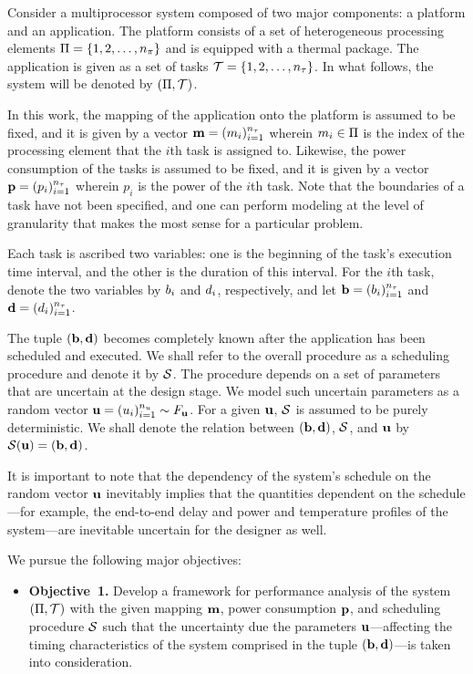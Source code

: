 Consider a multiprocessor system composed of two major components: a platform
and an application. The platform consists of a set of heterogeneous processing
elements $\Pi = \{ 1, 2, \dots, {n_\pi} \}$ and is equipped with a thermal
package. The application is given as a set of tasks $\mathcal{T} = \{ 1, 2, \dots,
{n_\tau} \}$. In what follows, the system will be denoted by $(\Pi, \mathcal{T})$.

In this work, the mapping of the application onto the platform is assumed to be
fixed, and it is given by a vector $\mathbf{m} = (m_i)_{i = 1}^{{n_\tau}}$ wherein $m_i
\in \Pi$ is the index of the processing element that the $i$th task is
assigned to. Likewise, the power consumption of the tasks is assumed to be
fixed, and it is given by a vector $\mathbf{p} = (p_i)_{i = 1}^{{n_\tau}}$ wherein $p_i$
is the power of the $i$th task. Note that the boundaries of a task have not been
specified, and one can perform modeling at the level of granularity that makes
the most sense for a particular problem.

Each task is ascribed two variables: one is the beginning of the task's
execution time interval, and the other is the duration of this interval. For the
$i$th task, denote the two variables by $b_i$ and $d_i$, respectively, and let
$\mathbf{b} = (b_i)_{i=1}^{{n_\tau}}$ and $\mathbf{d} = (d_i)_{i=1}^{{n_\tau}}$.

The tuple $(\mathbf{b}, \mathbf{d})$ becomes completely known after the application has been
scheduled and executed. We shall refer to the overall procedure as a scheduling
procedure and denote it by $\mathcal{S}$. The procedure depends on a set of
parameters that are uncertain at the design stage. We model such uncertain
parameters as a random vector $\mathbf{u} = (u_i)_{i = 1}^{n_u} \sim F_{\mathbf{u}}$.
For a given $\mathbf{u}$, $\mathcal{S}$ is assumed to be purely deterministic. We shall
denote the relation between $(\mathbf{b}, \mathbf{d})$, $\mathcal{S}$, and $\mathbf{u}$ by
$\mathcal{S}(\mathbf{u}) = (\mathbf{b}, \mathbf{d})$.

It is important to note that the dependency of the system's schedule on the
random vector $\mathbf{u}$ inevitably implies that the quantities dependent on the
schedule---for example, the end-to-end delay and power and temperature profiles
of the system---are inevitable uncertain for the designer as well.

We pursue the following major objectives:
\begin{itemize}

\item {\bfseries Objective~1.} Develop a framework for performance analysis of
  the system $(\Pi, \mathcal{T})$ with the given mapping $\mathbf{m}$, power
  consumption $\mathbf{p}$, and scheduling procedure $\mathcal{S}$ such that the
  uncertainty due the parameters $\mathbf{u}$---affecting the timing characteristics of
  the system comprised in the tuple $(\mathbf{b}, \mathbf{d})$---is taken into consideration.

\end{itemize}
